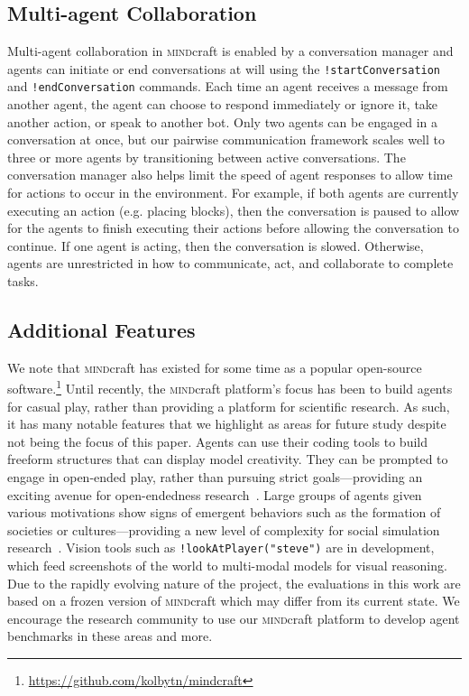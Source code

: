 \documentclass{article}
\newcommand{\mindcraft}{\textsc{mind}craft}
\begin{document}
\subsection{Multi-agent Collaboration}
Multi-agent collaboration in \mindcraft{} is enabled by a conversation manager and agents can initiate or end conversations at will using the \verb_!startConversation_ and \verb_!endConversation_ commands.
Each time an agent receives a message from another agent, the agent can choose to respond immediately or ignore it, take another action, or speak to another bot. 
Only two agents can be engaged in a conversation at once, but our pairwise communication framework scales well to three or more agents by transitioning between active conversations. 
The conversation manager also helps limit the speed of agent responses to allow time for actions to occur in the environment.
For example, if both agents are currently executing an action (e.g. placing blocks), then the conversation is paused to allow for the agents to finish executing their actions before allowing the conversation to continue.
If one agent is acting, then the conversation is slowed.
Otherwise, agents are unrestricted in how to communicate, act, and collaborate to complete tasks.

\subsection{Additional Features}
We note that \mindcraft{} has existed for some time as a popular open-source software.\footnote{\url{https://github.com/kolbytn/mindcraft}}
Until recently, the \mindcraft{} platform's focus has been to build agents for casual play, rather than providing a platform for scientific research.
As such, it has many notable features that we highlight as areas for future study despite not being the focus of this paper. 
Agents can use their coding tools to build freeform structures that can display model creativity. 
They can be prompted to engage in open-ended play, rather than pursuing strict goals---providing an exciting avenue for open-endedness research~\citep{stanley2015greatness}. 
Large groups of agents given various motivations show signs of emergent behaviors such as the formation of societies or cultures---providing a new level of complexity for social simulation research~\citep{ammanabrolu-etal-2021-motivate,park2023generative}. 
Vision tools such as \verb_!lookAtPlayer("steve")_ are in development, which feed screenshots of the world to multi-modal models for visual reasoning. 
Due to the rapidly evolving nature of the project, the evaluations in this work are based on a frozen version of \mindcraft{} which may differ from its current state.
We encourage the research community to use our \mindcraft{} platform to develop agent benchmarks in these areas and more.
\end{document}
